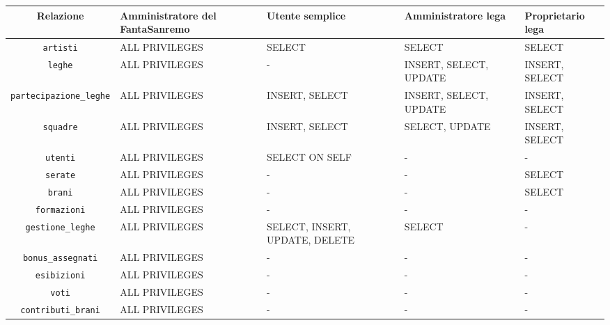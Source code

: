 \documentclass[a4paper]{article}
\begin{document}
\begin{center}
	\begin{footnotesize}
		\begin{tabular}{|c|p{2.7cm}|p{2.7cm}|p{2.7cm}|p{2.7cm}|}
			\hline
			{\bf Relazione} & \parbox{2.7cm}{\bf Amministratore del FantaSanremo} & \parbox{2.7cm}{\bf Utente semplice} &  \parbox{2.7cm}{\bf Amministratore lega} & \parbox{2.7cm}{\bf Proprietario lega} \\
			\hline
			\texttt{artisti} & ALL PRIVILEGES & SELECT & SELECT & SELECT \\
			\hline
			\texttt{leghe} & ALL PRIVILEGES & - & INSERT, SELECT, UPDATE & INSERT, SELECT \\
			\hline
			\texttt{partecipazione\_leghe} & ALL PRIVILEGES & INSERT, SELECT & INSERT, SELECT, UPDATE & INSERT, SELECT \\
			\hline
			\texttt{squadre} & ALL PRIVILEGES & INSERT, SELECT & SELECT, UPDATE & INSERT, SELECT \\
			\hline
			\texttt{utenti} & ALL PRIVILEGES & SELECT ON SELF & - & - \\
			\hline
			\texttt{serate} & ALL PRIVILEGES & - & - & SELECT \\
			\hline
			\texttt{brani} & ALL PRIVILEGES & - & - & SELECT \\
			\hline
			\texttt{formazioni} & ALL PRIVILEGES & - & - & - \\
			\hline
			\texttt{gestione\_leghe} & ALL PRIVILEGES & SELECT, INSERT, UPDATE, DELETE & SELECT & - \\
			\hline
			\texttt{bonus\_assegnati} & ALL PRIVILEGES & - & - & - \\
			\hline
			\texttt{esibizioni} & ALL PRIVILEGES & - & - & - \\
			\hline
			\texttt{voti} & ALL PRIVILEGES & - & - & - \\
			\hline
			\texttt{contributi\_brani} & ALL PRIVILEGES & - & - & - \\
			\hline
		\end{tabular}
	\end{footnotesize}
\end{center}
\end{document}
